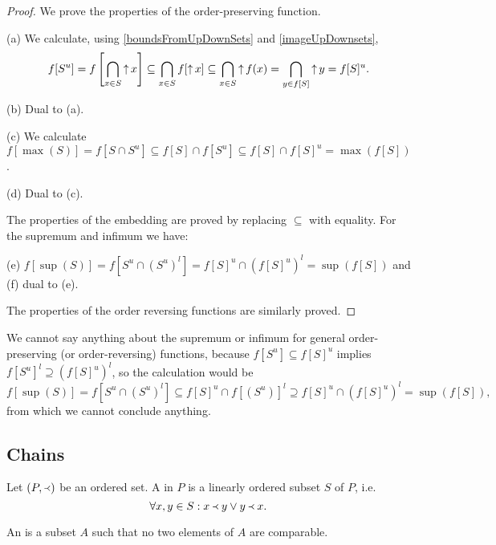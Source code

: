 \begin{proof}
We prove the properties of the order-preserving function.

(a) We calculate, using \ref{boundsFromUpDownSets} and \ref{imageUpDownsets},
\[ f[S^u] = f\left[\bigcap_{x\in S}\mathop{\uparrow} x\right] \subseteq \bigcap_{x\in S}f[\mathop{\uparrow} x] \subseteq \bigcap_{x\in S}\mathop{\uparrow} f(x) = \bigcap_{y\in f[S]}\mathop{\uparrow} y =  f[S]^u. \]

(b) Dual to (a).

(c) We calculate $f[\max(S)] = f[S\cap S^u] \subseteq f[S]\cap f[S^u] \subseteq f[S]\cap f[S]^u = \max(f[S])$.

(d) Dual to (c).

The properties of the embedding are proved by replacing $\subseteq$ with equality. For the supremum and infimum we have:

(e) $f[\sup(S)] = f[S^u\cap (S^u)^l] = f[S]^u \cap (f[S]^u)^l = \sup(f[S])$ and (f) dual to (e).

The properties of the order reversing functions are similarly proved.
\end{proof}
We cannot say anything about the supremum or infimum for general order-preserving (or order-reversing) functions, because $f[S^u] \subseteq f[S]^u$ implies $f[S^u]^l \supseteq (f[S]^u)^l$, so the calculation would be
\[ f[\sup(S)] = f[S^u\cap (S^u)^l] \subseteq f[S]^u \cap f[(S^u)]^l \supseteq f[S]^u \cap (f[S]^u)^l = \sup(f[S]), \]
from which we cannot conclude anything.

\subsection{Chains}
\begin{definition}
Let $(P,\Yleft)$ be an ordered set. A  in $P$ is a linearly ordered subset $S$ of $P$, i.e.
\[ \forall x,y\in S: x\Yleft y \lor y\Yleft x. \]

An  is a subset $A$ such that no two elements of $A$ are comparable.
\end{definition}

